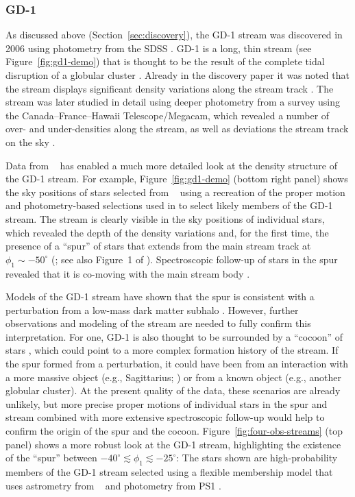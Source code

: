 \documentclass[final,5p,times,twocolumn,authoryear]{elsarticle}
\begin{document}
\subsubsection{GD-1}
\label{sec:gd1}

As discussed above (Section~\ref{sec:discovery}), the GD-1 stream was discovered in 2006
using photometry from the SDSS \citep{grillmair:2006-gd1}.
GD-1 is a long, thin stream (see Figure~\ref{fig:gd1-demo}) that is thought to be the
result of the complete tidal disruption of a globular cluster \citep{koposov:2010}.
Already in the discovery paper it was noted that the stream displays significant density
variations along the stream track \citep{grillmair:2006-gd1}.
The stream was later studied in detail using deeper photometry from a survey using the
Canada--France--Hawaii Telescope/Megacam, which revealed a number of over- and
under-densities along the stream, as well as deviations  the stream track
on the sky \citep{deboer:2018}.

Data from \gaia\  has enabled a much more detailed look at the density structure
of the GD-1 stream.
For example, Figure~\ref{fig:gd1-demo} (bottom right panel) shows the sky positions of
stars selected from \gaia\  using a recreation of the proper motion and
photometry-based selections used in \citep{price-whelan:2018} to select likely members
of the GD-1 stream.
The stream is clearly visible in the sky positions of individual stars, which revealed
the depth of the density variations and, for the first time, the presence of a ``spur''
of stars that extends from the main stream track at $\phi_1 \sim -50^\circ$
(\citealt{price-whelan:2018}; see also Figure~1 of \citealt{bonaca:2019b}).
Spectroscopic follow-up of stars in the spur revealed that it is co-moving with the main
stream body \citep{bonaca:2020b}.

Models of the GD-1 stream have shown that the spur is consistent with a perturbation
from a low-mass dark matter subhalo \citep{bonaca:2019, bonaca:2020b}.
However, further observations and modeling of the stream are needed to fully confirm
this interpretation.
For one, GD-1 is also thought to be surrounded by a ``cocoon'' of stars
\citep{malhan:2019a}, which could point to a more complex formation history of the
stream.
If the spur formed from a perturbation, it could have been from an interaction with a
more massive object (e.g., Sagittarius; \citealt{deboer:2020,dillamore:2022}) or from a known object
(e.g., another globular cluster).
At the present quality of the data, these scenarios are already unlikely, but more
precise proper motions of individual stars in the spur and stream combined with more
extensive spectroscopic follow-up would help to confirm the origin of the spur and the
cocoon.
Figure~\ref{fig:four-obs-streams} (top panel) shows a more robust look at the GD-1
stream, highlighting the existence of the ``spur'' between $-40^\circ \lesssim \phi_1
\lesssim -25^\circ$: The stars shown are high-probability members of the GD-1 stream
selected using a flexible membership model that uses astrometry from \gaia\  and
photometry from PS1 \citep{tavangar:2024}.
\end{document}
